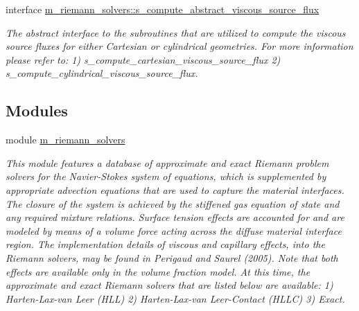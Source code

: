 \begin{DoxyCompactItemize}
interface \hyperlink{interfacem__riemann__solvers_1_1s__compute__abstract__viscous__source__flux}{m\+\_\+riemann\+\_\+solvers\+::s\+\_\+compute\+\_\+abstract\+\_\+viscous\+\_\+source\+\_\+flux}
\begin{DoxyCompactList}\small\item\em The abstract interface to the subroutines that are utilized to compute the viscous source fluxes for either Cartesian or cylindrical geometries. For more information please refer to\+: 1) s\+\_\+compute\+\_\+cartesian\+\_\+viscous\+\_\+source\+\_\+flux 2) s\+\_\+compute\+\_\+cylindrical\+\_\+viscous\+\_\+source\+\_\+flux. \end{DoxyCompactList}\end{DoxyCompactItemize}
\subsection*{Modules}
\begin{DoxyCompactItemize}
\item 
module \hyperlink{namespacem__riemann__solvers}{m\+\_\+riemann\+\_\+solvers}
\begin{DoxyCompactList}\small\item\em This module features a database of approximate and exact Riemann problem solvers for the Navier-\/\+Stokes system of equations, which is supplemented by appropriate advection equations that are used to capture the material interfaces. The closure of the system is achieved by the stiffened gas equation of state and any required mixture relations. Surface tension effects are accounted for and are modeled by means of a volume force acting across the diffuse material interface region. The implementation details of viscous and capillary effects, into the Riemann solvers, may be found in Perigaud and Saurel (2005). Note that both effects are available only in the volume fraction model. At this time, the approximate and exact Riemann solvers that are listed below are available\+: 1) Harten-\/\+Lax-\/van Leer (H\+LL) 2) Harten-\/\+Lax-\/van Leer-\/\+Contact (H\+L\+LC) 3) Exact. \end{DoxyCompactList}\end{DoxyCompactItemize}
